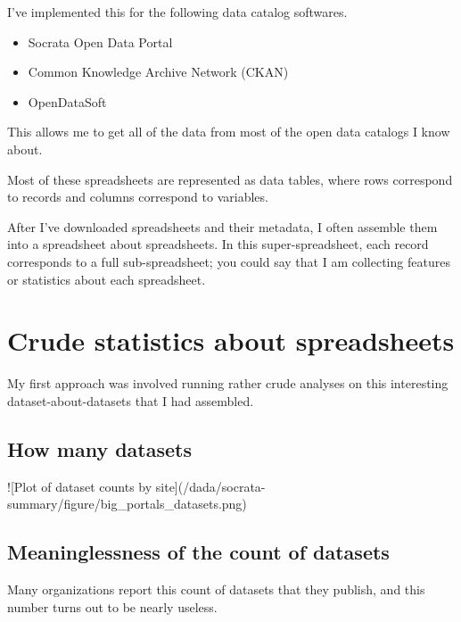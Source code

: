 \documentclass{acm_proc_article-sp}
\begin{document}
I've implemented this for the following data catalog softwares.

\begin{itemize}
\item Socrata Open Data Portal
\item Common Knowledge Archive Network (CKAN)
\item OpenDataSoft
\end{itemize}

This allows me to get all of the data from most of the open data catalogs I know about.

Most of these spreadsheets are represented as data tables,
where rows correspond to records and columns correspond to variables. \cite{table}

After I've downloaded spreadsheets and their metadata,
I often assemble them into a spreadsheet about spreadsheets. \cite{data-driven}
In this super-spreadsheet, each record corresponds to a full
sub-spreadsheet; you could say that I am collecting features or statistics
about each spreadsheet.

\section{Crude statistics about spreadsheets}
My first approach was involved running rather crude analyses on this
interesting dataset-about-datasets that I had assembled.

\subsection{How many datasets}
![Plot of dataset counts by site](/dada/socrata-summary/figure/big_portals_datasets.png)

\subsection{Meaninglessness of the count of datasets}

Many organizations report this count of datasets that they publish, and this number
turns out to be nearly useless.
\end{document}
